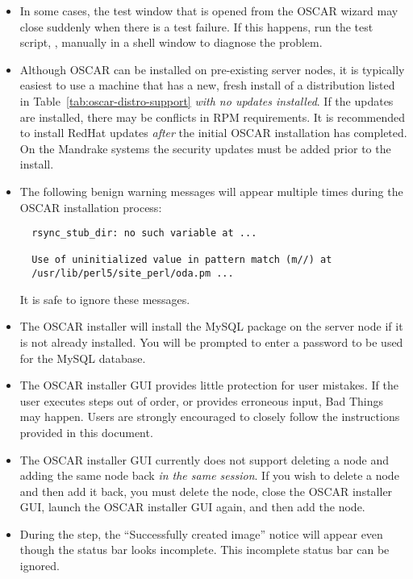 \begin{itemize}
\item In some cases, the test window that is opened from the 
  OSCAR wizard may close suddenly when there is a test failure. If
  this happens, run the test script, ,
  manually in a shell window to diagnose the problem.
 
\item Although OSCAR can be installed on pre-existing server nodes, it
  is typically easiest to use a machine that has a new, fresh install
\begchange
  of a distribution listed in Table~\ref{tab:oscar-distro-support}
  {\em with no updates installed}.  If the updates are installed,
  there may be conflicts in RPM requirements.  It is recommended to
  install RedHat updates {\em after} the initial OSCAR installation has
  completed.  On the Mandrake systems the security updates must be added
  prior to the install.
  
\item The following benign warning messages will appear multiple times
  during the OSCAR installation process:

\begin{verbatim}
  rsync_stub_dir: no such variable at ...

  Use of uninitialized value in pattern match (m//) at 
  /usr/lib/perl5/site_perl/oda.pm ...
\end{verbatim}
\endchange

  It is safe to ignore these messages.
  
\item The OSCAR installer will install the MySQL package on the server
  node if it is not already installed.  You will be prompted to enter a
\begchange
  password to be used for the MySQL database.
\endchange  

\item The OSCAR installer GUI provides little protection for user
  mistakes.  If the user executes steps out of order, or provides
  erroneous input, Bad Things may happen.  Users are strongly
  encouraged to closely follow the instructions provided in this
  document.

\item The OSCAR installer GUI currently does not support deleting a
  node and adding the same node back {\em in the same session}.  If
  you wish to delete a node and then add it back, you must delete the
  node, close the OSCAR installer GUI, launch the OSCAR installer GUI
  again, and then add the node.

\item During the  step, the ``Successfully
  created image'' notice will appear even though the status bar looks
  incomplete.  This incomplete status bar can be ignored.


\end{itemize}
